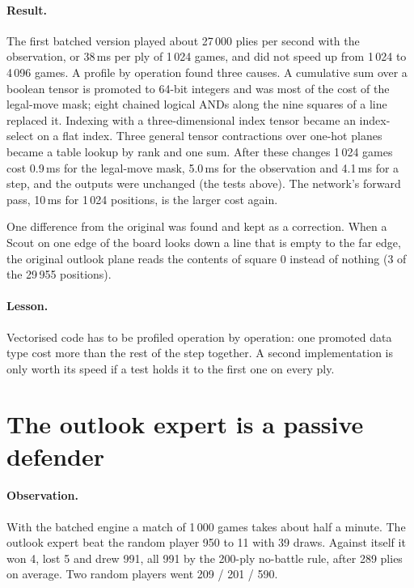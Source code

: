 \paragraph{Result.} The first batched version played about 27\,000 plies per second with the
observation, or 38\,ms per ply of 1\,024 games, and did not speed up from 1\,024 to 4\,096 games.
A profile by operation found three causes. A cumulative sum over a boolean tensor is promoted to
64-bit integers and was most of the cost of the legal-move mask; eight chained logical ANDs along
the nine squares of a line replaced it. Indexing with a three-dimensional index tensor became an
index-select on a flat index. Three general tensor contractions over one-hot planes became a table
lookup by rank and one sum. After these changes 1\,024 games cost 0.9\,ms for the legal-move mask,
5.0\,ms for the observation and 4.1\,ms for a step, and the outputs were unchanged (the tests
above). The network's forward pass, 10\,ms for 1\,024 positions, is the larger cost again.

One difference from the original was found and kept as a correction. When a Scout on one edge of
the board looks down a line that is empty to the far edge, the original outlook plane reads the
contents of square 0 instead of nothing (3 of the 29\,955 positions).

\paragraph{Lesson.} Vectorised code has to be profiled operation by operation: one promoted data
type cost more than the rest of the step together. A second implementation is only worth its speed
if a test holds it to the first one on every ply.

\section{The outlook expert is a passive defender}
\label{sec:passive-expert}

\paragraph{Observation.} With the batched engine a match of 1\,000 games takes about half a
minute. The outlook expert beat the random player 950 to 11 with 39 draws. Against itself it won 4,
lost 5 and drew 991, all 991 by the 200-ply no-battle rule, after 289 plies on average. Two random
players went 209 / 201 / 590.

